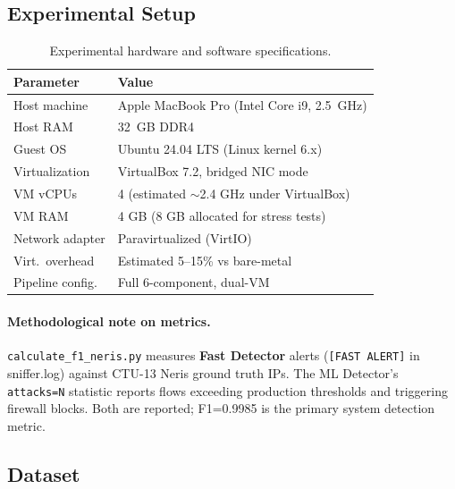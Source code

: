 \documentclass[11pt,a4paper]{article}
\begin{document}
    \subsection{Experimental Setup}

    \begin{table}[h]
        \centering
        \caption{Experimental hardware and software specifications.}
        \label{tab:setup}
        \begin{tabular}{ll}
            \toprule
            \textbf{Parameter} & \textbf{Value} \\
            \midrule
            Host machine       & Apple MacBook Pro (Intel Core i9, 2.5~GHz) \\
            Host RAM           & 32~GB DDR4 \\
            Guest OS           & Ubuntu 24.04 LTS (Linux kernel 6.x) \\
            Virtualization     & VirtualBox 7.2, bridged NIC mode \\
            VM vCPUs           & 4 (estimated ${\sim}$2.4 GHz under VirtualBox) \\
            VM RAM             & 4 GB (8 GB allocated for stress tests) \\
            Network adapter    & Paravirtualized (VirtIO) \\
            Virt.\ overhead    & Estimated 5--15\% vs bare-metal \\
            Pipeline config.   & Full 6-component, dual-VM \\
            \bottomrule
        \end{tabular}
    \end{table}

    \paragraph{Methodological note on metrics.}
    \texttt{calculate\_f1\_neris.py} measures \textbf{Fast Detector} alerts
    (\texttt{[FAST ALERT]} in sniffer.log) against CTU-13 Neris ground truth IPs. The ML
    Detector's \texttt{attacks=N} statistic reports flows exceeding production thresholds and
    triggering firewall blocks. Both are reported; F1=0.9985 is the primary system detection
    metric.

    \subsection{Dataset}
\end{document}
